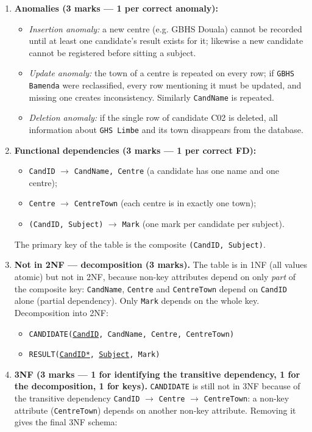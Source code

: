 \documentclass[11pt]{article}
\begin{document}
\begin{corrige}
\begin{enumerate}
\item \textbf{Anomalies (3 marks — 1 per correct anomaly):}
\begin{itemize}
\item \emph{Insertion anomaly:} a new centre (e.g. GBHS Douala) cannot be recorded until at least one candidate's result exists for it; likewise a new candidate cannot be registered before sitting a subject.
\item \emph{Update anomaly:} the town of a centre is repeated on every row; if \texttt{GBHS Bamenda} were reclassified, every row mentioning it must be updated, and missing one creates inconsistency. Similarly \texttt{CandName} is repeated.
\item \emph{Deletion anomaly:} if the single row of candidate C02 is deleted, all information about \texttt{GHS Limbe} and its town disappears from the database.
\end{itemize}
\item \textbf{Functional dependencies (3 marks — 1 per correct FD):}
\begin{itemize}
\item \texttt{CandID} $\rightarrow$ \texttt{CandName, Centre} (a candidate has one name and one centre);
\item \texttt{Centre} $\rightarrow$ \texttt{CentreTown} (each centre is in exactly one town);
\item \texttt{(CandID, Subject)} $\rightarrow$ \texttt{Mark} (one mark per candidate per subject).
\end{itemize}
The primary key of the table is the composite \texttt{(CandID, Subject)}.
\item \textbf{Not in 2NF — decomposition (3 marks).} The table is in 1NF (all values atomic) but not in 2NF, because non-key attributes depend on only \emph{part} of the composite key: \texttt{CandName}, \texttt{Centre} and \texttt{CentreTown} depend on \texttt{CandID} alone (partial dependency). Only \texttt{Mark} depends on the whole key. Decomposition into 2NF:
\begin{itemize}
\item \texttt{CANDIDATE(\underline{CandID}, CandName, Centre, CentreTown)}
\item \texttt{RESULT(\underline{CandID*}, \underline{Subject}, Mark)}
\end{itemize}
\item \textbf{3NF (3 marks — 1 for identifying the transitive dependency, 1 for the decomposition, 1 for keys).} \texttt{CANDIDATE} is still not in 3NF because of the transitive dependency \texttt{CandID} $\rightarrow$ \texttt{Centre} $\rightarrow$ \texttt{CentreTown}: a non-key attribute (\texttt{CentreTown}) depends on another non-key attribute. Removing it gives the final 3NF schema:

\end{enumerate}
\end{corrige}
\end{document}
